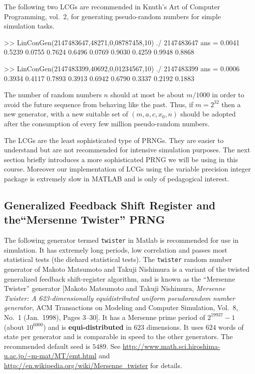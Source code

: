 \begin{labwork}
The following two LCGs are recommended in Knuth's Art of Computer Programming, vol.~2, for generating pseudo-random numbers for simple simulation tasks.
\begin{VrbM}
>> LinConGen(2147483647,48271,0,08787458,10) ./ 2147483647
ans =    0.0041    0.5239    0.0755    0.7624    0.6496    0.0769    0.9030    0.4259    0.9948    0.8868

>> LinConGen(2147483399,40692,0,01234567,10) ./ 2147483399
ans =    0.0006    0.3934    0.4117    0.7893    0.3913    0.6942    0.6790    0.3337    0.2192    0.1883
\end{VrbM}
\end{labwork}

The number of random numbers $n$ should at most be about $m/1000$ in order to avoid the future sequence from behaving like the past.  Thus, if $m=2^{32}$ then a new generator, with a new suitable set of $(m,a,c,x_0,n)$ should be adopted after the consumption of every few million pseudo-random numbers.

The LCGs are the least sophisticated type of PRNGs.  They are easier to understand but are not recommended for intensive simulation purposes.  The next section briefly introduces a more sophisticated PRNG we will be using in this course.  Moreover our implementation of LCGs using the variable precision integer package is extremely slow in {\sc MATLAB} and is only of pedagogical interest. 

\subsection{Generalized Feedback Shift Register  and the``Mersenne Twister'' PRNG} 

The following generator termed {\tt twister} in {\sc Matlab} is recommended for use in simulation.  It has extremely long periods, low correlation and passes most statistical tests (the {\sc diehard} statistical tests).  The {\tt twister} random number generator of Makoto Matsumoto and Takuji Nishimura is a variant of the twisted generalized feedback shift-register algorithm, and is known as the ``Mersenne Twister'' generator [Makoto Matsumoto and Takuji Nishimura, {\em Mersenne Twister: A 623-dimensionally equidistributed uniform pseudorandom number generator}, ACM Transactions on Modeling and Computer
Simulation, Vol.~8, No.~1 (Jan.~1998), Pages 3--30].  It has a Mersenne prime period of $2^{19937} - 1$ (about $10^{6000}$) and is {\bf equi-distributed} in $623$ dimensions.  It uses $624$ words of state per generator and is comparable in speed to the other generators.  The recommended default seed is $5489$.  See \url{http://www.math.sci.hiroshima-u.ac.jp/~m-mat/MT/emt.html} and \url{http://en.wikipedia.org/wiki/Mersenne_twister} for details.  

